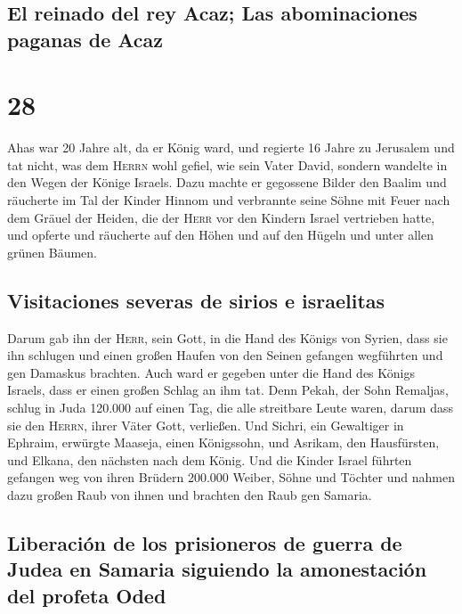 \hypertarget{el-reinado-del-rey-acaz-las-abominaciones-paganas-de-acaz}{%
\subsection{El reinado del rey Acaz; Las abominaciones paganas de
Acaz}\label{el-reinado-del-rey-acaz-las-abominaciones-paganas-de-acaz}}

\hypertarget{section-27}{%
\section{28}\label{section-27}}

 Ahas war 20 Jahre alt, da er König ward, und regierte 16
Jahre zu Jerusalem und tat nicht, was dem \textsc{Herrn} wohl gefiel,
wie sein Vater David,  sondern wandelte in den Wegen der
Könige Israels. Dazu machte er gegossene Bilder den Baalim
 und räucherte im Tal der Kinder Hinnom und verbrannte
seine Söhne mit Feuer nach dem Gräuel der Heiden, die der \textsc{Herr}
vor den Kindern Israel vertrieben hatte,  und opferte und
räucherte auf den Höhen und auf den Hügeln und unter allen grünen
Bäumen.

\hypertarget{visitaciones-severas-de-sirios-e-israelitas}{%
\subsection{Visitaciones severas de sirios e
israelitas}\label{visitaciones-severas-de-sirios-e-israelitas}}

 Darum gab ihn der \textsc{Herr}, sein Gott, in die Hand
des Königs von Syrien, dass sie ihn schlugen und einen großen Haufen von
den Seinen gefangen wegführten und gen Damaskus brachten. Auch ward er
gegeben unter die Hand des Königs Israels, dass er einen großen Schlag
an ihm tat.  Denn Pekah, der Sohn Remaljas, schlug in Juda
120.000 auf einen Tag, die alle streitbare Leute waren, darum dass sie
den \textsc{Herrn}, ihrer Väter Gott, verließen.  Und
Sichri, ein Gewaltiger in Ephraim, erwürgte Maaseja, einen Königssohn,
und Asrikam, den Hausfürsten, und Elkana, den nächsten nach dem König.
 Und die Kinder Israel führten gefangen weg von ihren
Brüdern 200.000 Weiber, Söhne und Töchter und nahmen dazu großen Raub
von ihnen und brachten den Raub gen Samaria.

\hypertarget{liberaciuxf3n-de-los-prisioneros-de-guerra-de-judea-en-samaria-siguiendo-la-amonestaciuxf3n-del-profeta-oded}{%
\subsection{Liberación de los prisioneros de guerra de Judea en Samaria
siguiendo la amonestación del profeta
Oded}\label{liberaciuxf3n-de-los-prisioneros-de-guerra-de-judea-en-samaria-siguiendo-la-amonestaciuxf3n-del-profeta-oded}}


